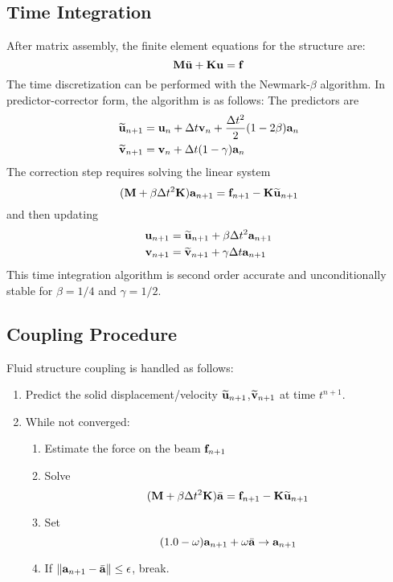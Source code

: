 \documentclass{article}
\begin{document}
\subsection{Time Integration}
After matrix assembly, the finite element equations for the structure are:
\begin{equation} {\bf M}\ddot{\bf u} + {\bf K}{\bf u} = {\bf f} \label{eq:eq5700} \end{equation}
The time discretization can be performed with the Newmark-$\beta$ algorithm.  
In predictor-corrector form, the algorithm is as follows:  The predictors are 
\begin{equation} \begin{aligned}
\widetilde{{\bf u}}_{n+1} &= {\bf u}_n + \Delta t {\bf v}_n + \frac{\Delta t^2}{2}(1-2\beta){\bf a}_n \\
\widetilde{{\bf v}}_{n+1} &= {\bf v}_n + \Delta t (1-\gamma) {\bf a}_n 
\end{aligned} \label{eq:eq5800} \end{equation}
The correction step requires solving the linear system
\begin{equation}
 ({\bf M}+\beta \Delta t^2{\bf K}){\bf a}_{n+1} = {\bf f}_{n+1} - {\bf K}\widetilde{{\bf u}}_{n+1} 
\label{eq:eq5900}
\end{equation}
and then updating
\begin{equation} \begin{aligned}
{\bf u}_{n+1} &= \widetilde{{\bf u}}_{n+1} + \beta \Delta t^2 {\bf a}_{n+1} \\
{\bf v}_{n+1} &= \widetilde{{\bf v}}_{n+1} + \gamma \Delta t {\bf a}_{n+1}
\end{aligned} \label{eq:eq6000} \end{equation}
This time integration algorithm is second order accurate and unconditionally stable for $\beta = 1/4$ and $\gamma = 1/2$.
\subsection{Coupling Procedure}
Fluid structure coupling is handled as follows:
\begin{enumerate}
\item Predict the solid displacement/velocity $\widetilde{{\bf u}}_{n+1}$,$\widetilde{{\bf v}}_{n+1}$ at time $t^{n+1}$.
\item While not converged:
  \begin{enumerate}
    \item Estimate the force on the beam ${\bf f}_{n+1}$
    \item Solve 
      \[ ({\bf M}+\beta \Delta t^2{\bf K})\bar{{\bf a}} = {\bf f}_{n+1} - {\bf K}\widetilde{{\bf u}}_{n+1} \]
    \item Set 
      \[ (1.0-\omega){\bf a}_{n+1} + \omega \bar{{\bf a}} \to {\bf a}_{n+1} \]
    \item If $\|{\bf a}_{n+1} - \bar{{\bf a}} \| \leq \epsilon$, break.
  \end{enumerate}
\end{enumerate}
 
\end{document}
